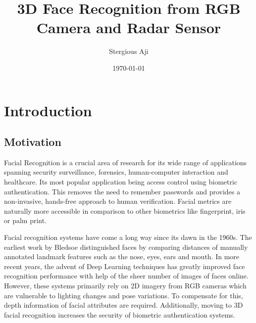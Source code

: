 \documentclass{interim}
\begin{document}
\title{3D Face Recognition from RGB Camera and Radar Sensor}
\author{Stergious Aji}
\date{\today}
\maketitle

\tableofcontents
\newpage

\section{Introduction}\label{intro}

\subsection{Motivation}
Facial Recognition is a crucial area of research for its wide range of applications spanning security surveillance, forensics, human-computer interaction and healthcare. Its most popular application being access control using biometric authentication. This removes the need to remember passwords and provides a non-invasive, hands-free approach to human verification. Facial metrics are naturally more accessible in comparison to other biometrics like fingerprint, iris or palm print.

Facial recognition systems have come a long way since its dawn in the 1960s. The earliest work by Bledsoe \cite{bledsoe1966model} distinguished faces by comparing distances of manually annotated landmark features such as the nose, eyes, ears and mouth. In more recent years, the advent of Deep Learning techniques has greatly improved face recognition performance with help of the sheer number of images of faces online. However, these systems primarily rely on 2D imagery from RGB cameras which are vulnerable to lighting changes and pose variations. To compensate for this, depth information of facial attributes are required. Additionally, moving to 3D facial recognition increases the security of biometric authentication systems.
\end{document}
